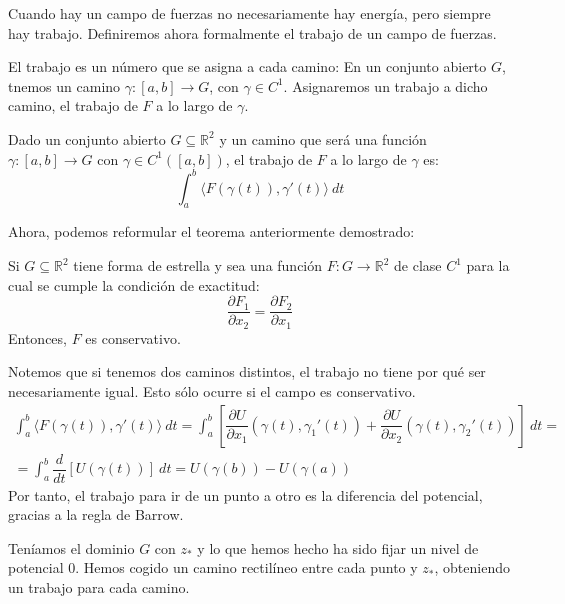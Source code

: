 Cuando hay un campo de fuerzas no necesariamente hay energía, pero siempre hay trabajo. Definiremos ahora formalmente el trabajo de un campo de fuerzas.

El trabajo es un número que se asigna a cada camino:
En un conjunto abierto $G$, tnemos un camino $\gamma:[a,b]\rightarrow G$, con $\gamma\in C^1$. Asignaremos un trabajo a dicho camino, el trabajo de $F$ a lo largo de $\gamma$.

\begin{definicion}[Trabajo]
    Dado un conjunto abierto $G\subseteq \mathbb{R}^2$ y un camino que será una función $\gamma:[a,b]\rightarrow G$ con $\gamma\in C^1([a,b])$, el trabajo de $F$ a lo largo de $\gamma$ es:
    \begin{equation*}
        \int_{a}^{b} \langle F(\gamma(t)),\gamma'(t) \rangle~dt 
    \end{equation*}
\end{definicion}

Ahora, podemos reformular el teorema anteriormente demostrado:

\begin{teo}
    Si $G\subseteq \mathbb{R}^2$ tiene forma de estrella y sea una función $F:G\rightarrow\mathbb{R}^2$ de clase $C^1$ para la cual se cumple la condición de exactitud:
    \begin{equation*}
        \dfrac{\partial F_1}{\partial x_2} = \dfrac{\partial F_2}{\partial x_1}
    \end{equation*}
    Entonces, $F$ es conservativo.
\end{teo}
Notemos que si tenemos dos caminos distintos, el trabajo no tiene por qué ser necesariamente igual. Esto sólo ocurre si el campo es conservativo.
\begin{gather*}
    \int_{a}^{b} \langle F(\gamma(t)), \gamma'(t) \rangle~dt  = \int_{a}^{b} \left[\dfrac{\partial U}{\partial x_1}(\gamma(t), \gamma_1'(t)) + \dfrac{\partial U}{\partial x_2}(\gamma(t),\gamma_2'(t))\right]~dt  = \\
    = \int_{a}^{b} \dfrac{d}{dt}[U(\gamma(t))]~dt = U(\gamma(b)) - U(\gamma(a))
\end{gather*}
Por tanto, el trabajo para ir de un punto a otro es la diferencia del potencial, gracias a la regla de Barrow.

Teníamos el dominio $G$ con $z_\ast$ y lo que hemos hecho ha sido fijar un nivel de potencial 0. Hemos cogido un camino rectilíneo entre cada punto y $z_\ast$, obteniendo un trabajo para cada camino.
